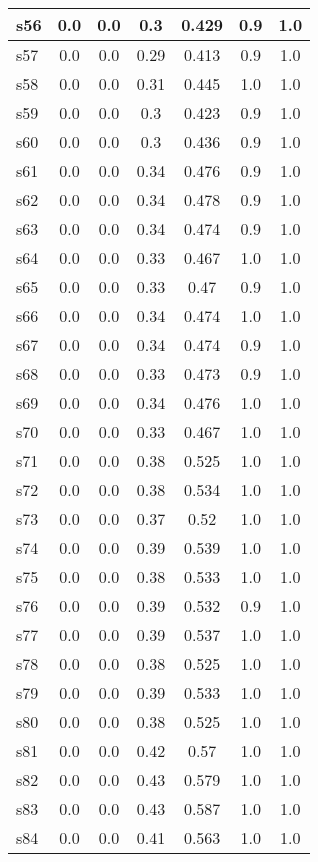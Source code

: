 \documentclass{article}
\begin{document}
\begin{tabular}{|l|c|c|c|c|c|c|}
\hline
s56 &0.0 & 0.0 & 0.3 & 0.429 & 0.9 & 1.0\\
\hline
s57 &0.0 & 0.0 & 0.29 & 0.413 & 0.9 & 1.0\\
\hline
s58 &0.0 & 0.0 & 0.31 & 0.445 & 1.0 & 1.0\\
\hline
s59 &0.0 & 0.0 & 0.3 & 0.423 & 0.9 & 1.0\\
\hline
s60 &0.0 & 0.0 & 0.3 & 0.436 & 0.9 & 1.0\\
\hline
s61 &0.0 & 0.0 & 0.34 & 0.476 & 0.9 & 1.0\\
\hline
s62 &0.0 & 0.0 & 0.34 & 0.478 & 0.9 & 1.0\\
\hline
s63 &0.0 & 0.0 & 0.34 & 0.474 & 0.9 & 1.0\\
\hline
s64 &0.0 & 0.0 & 0.33 & 0.467 & 1.0 & 1.0\\
\hline
s65 &0.0 & 0.0 & 0.33 & 0.47 & 0.9 & 1.0\\
\hline
s66 &0.0 & 0.0 & 0.34 & 0.474 & 1.0 & 1.0\\
\hline
s67 &0.0 & 0.0 & 0.34 & 0.474 & 0.9 & 1.0\\
\hline
s68 &0.0 & 0.0 & 0.33 & 0.473 & 0.9 & 1.0\\
\hline
s69 &0.0 & 0.0 & 0.34 & 0.476 & 1.0 & 1.0\\
\hline
s70 &0.0 & 0.0 & 0.33 & 0.467 & 1.0 & 1.0\\
\hline
s71 &0.0 & 0.0 & 0.38 & 0.525 & 1.0 & 1.0\\
\hline
s72 &0.0 & 0.0 & 0.38 & 0.534 & 1.0 & 1.0\\
\hline
s73 &0.0 & 0.0 & 0.37 & 0.52 & 1.0 & 1.0\\
\hline
s74 &0.0 & 0.0 & 0.39 & 0.539 & 1.0 & 1.0\\
\hline
s75 &0.0 & 0.0 & 0.38 & 0.533 & 1.0 & 1.0\\
\hline
s76 &0.0 & 0.0 & 0.39 & 0.532 & 0.9 & 1.0\\
\hline
s77 &0.0 & 0.0 & 0.39 & 0.537 & 1.0 & 1.0\\
\hline
s78 &0.0 & 0.0 & 0.38 & 0.525 & 1.0 & 1.0\\
\hline
s79 &0.0 & 0.0 & 0.39 & 0.533 & 1.0 & 1.0\\
\hline
s80 &0.0 & 0.0 & 0.38 & 0.525 & 1.0 & 1.0\\
\hline
s81 &0.0 & 0.0 & 0.42 & 0.57 & 1.0 & 1.0\\
\hline
s82 &0.0 & 0.0 & 0.43 & 0.579 & 1.0 & 1.0\\
\hline
s83 &0.0 & 0.0 & 0.43 & 0.587 & 1.0 & 1.0\\
\hline
s84 &0.0 & 0.0 & 0.41 & 0.563 & 1.0 & 1.0\\

\end{tabular}
\end{document}

